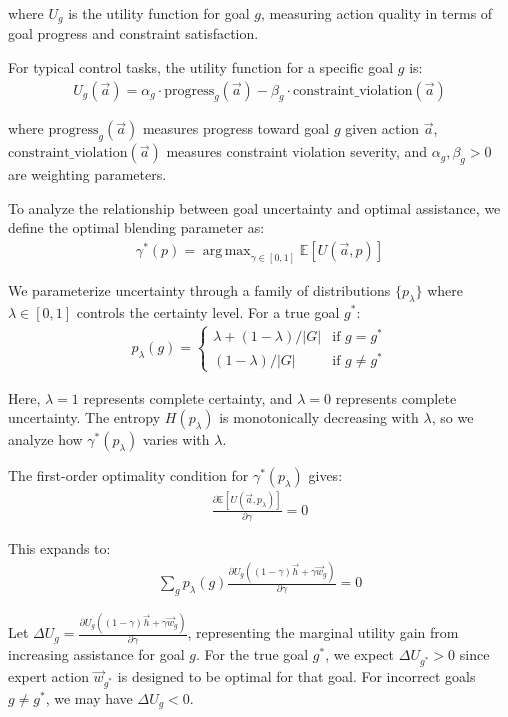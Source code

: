 \documentclass[11pt]{article}
\DeclareMathOperator*{\argmax}{arg\,max}
\begin{document}
where $U_g$ is the utility function for goal $g$, measuring action 
quality in terms of goal progress and constraint satisfaction.

For typical control tasks, the utility function for a specific goal $g$ is:
\begin{align}
U_g(\vec{a}) = \alpha_g \cdot \text{progress}_g(\vec{a}) - \beta_g \cdot \text{constraint\_violation}(\vec{a})
\end{align}

where $\text{progress}_g(\vec{a})$ measures progress toward goal $g$ given 
action $\vec{a}$, $\text{constraint\_violation}(\vec{a})$ measures 
constraint violation severity, and $\alpha_g, \beta_g > 0$ are weighting parameters.

To analyze the relationship between goal uncertainty and optimal assistance, 
we define the optimal blending parameter as:
\begin{align}
    \gamma^*(p) = \argmax_{\gamma \in [0,1]} \mathbb{E}[U(\vec{a}, p)]
\end{align}




We parameterize uncertainty through a family of distributions $\{p_\lambda\}$ 
where $\lambda \in [0,1]$ controls the certainty level. For a true goal $g^*$:
\begin{align}
p_\lambda(g) = 
\begin{cases}
\lambda + (1-\lambda)/|G| & \text{if } g = g^* \\
(1-\lambda)/|G| & \text{if } g \neq g^*
\end{cases}
\end{align}

Here, $\lambda = 1$ represents complete certainty, and $\lambda = 0$ represents 
complete uncertainty. The entropy $H(p_\lambda)$ is monotonically decreasing 
with $\lambda$, so we analyze how $\gamma^*(p_\lambda)$ varies with $\lambda$.

The first-order optimality condition for $\gamma^*(p_\lambda)$ gives:
\begin{align}
\frac{\partial \mathbb{E}[U(\vec{a}, p_\lambda)]}{\partial \gamma} = 0
\end{align}

This expands to:
\begin{align}
\sum_g p_\lambda(g) \frac{\partial U_g((1-\gamma)\vec{h} + \gamma\vec{w}_g)}{\partial \gamma} = 0
\end{align}

Let $\Delta U_g = \frac{\partial U_g((1-\gamma)\vec{h} + \gamma\vec{w}_g)}{\partial \gamma}$, 
representing the marginal utility gain from increasing assistance for goal $g$. 
For the true goal $g^*$, we expect $\Delta U_{g^*} > 0$ since expert action 
$\vec{w}_{g^*}$ is designed to be optimal for that goal. For incorrect goals 
$g \neq g^*$, we may have $\Delta U_g < 0$.
\end{document}
